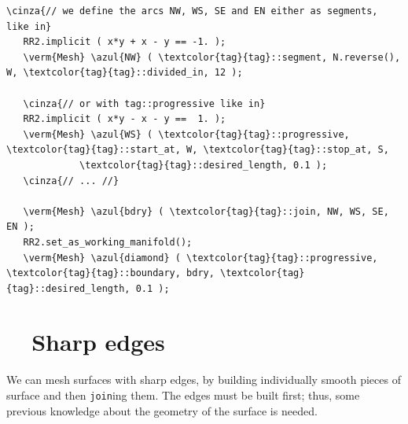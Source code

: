 \begin{Verbatim}[commandchars=\\\{\},formatcom=\small\tt,frame=single,
   label=parag-\ref{\numb section 3.\numb parag 17}.cpp,rulecolor=\color{coment},
   baselinestretch=0.94,framesep=2mm                                            ]
   \cinza{// we define the arcs NW, WS, SE and EN either as segments, like in}
   RR2.implicit ( x*y + x - y == -1. );
   \verm{Mesh} \azul{NW} ( \textcolor{tag}{tag}::segment, N.reverse(), W, \textcolor{tag}{tag}::divided_in, 12 );
   
   \cinza{// or with tag::progressive like in}
   RR2.implicit ( x*y - x - y ==  1. );
   \verm{Mesh} \azul{WS} ( \textcolor{tag}{tag}::progressive, \textcolor{tag}{tag}::start_at, W, \textcolor{tag}{tag}::stop_at, S,
             \textcolor{tag}{tag}::desired_length, 0.1 );
   \cinza{// ... //}
             
   \verm{Mesh} \azul{bdry} ( \textcolor{tag}{tag}::join, NW, WS, SE, EN );
   RR2.set_as_working_manifold();
   \verm{Mesh} \azul{diamond} ( \textcolor{tag}{tag}::progressive, \textcolor{tag}{tag}::boundary, bdry, \textcolor{tag}{tag}::desired_length, 0.1 );
\end{Verbatim}





\section{~~Sharp edges}\label{\numb section 3.\numb parag 18}

We can mesh surfaces with sharp edges, by building individually smooth pieces of surface
and then {\small\tt join}ing them.
The edges must be built first;
thus, some previous knowledge about the geometry of the surface is needed.

